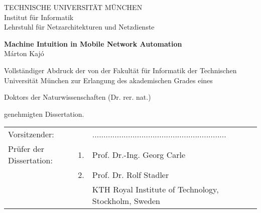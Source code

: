 

\begin{titlepage}
\setlength{\parindent}{0cm}
\begin{center}
	\large
  TECHNISCHE UNIVERSIT\"AT M\"UNCHEN\\
  Institut f\"ur Informatik\\
  Lehrstuhl f\"ur Netzarchitekturen und Netzdienste\\
\end{center}

\vfill

\begin{center}
	\Large
  \textbf{
  Machine Intuition in Mobile Network Automation}\\[1cm]
 	\large
  Márton Kajó
\end{center}

\vfill

Vollst\"andiger Abdruck der von der Fakult\"at f\"ur Informatik %
der Technischen Universit\"at M\"unchen zur Erlangung des akademischen Grades eines
\begin{center}
Doktors der Naturwissenschaften (Dr. rer. nat.)
\end{center}
genehmigten Dissertation.

\vspace{0.5cm}

\begin{center}
\setlength{\tabcolsep}{0pt}
\begin{tabular}{p{4.7cm}p{0.7cm}l}
Vorsitzender:               &    & ............................................................\\
Pr\"ufer der Dissertation:  & 1. & Prof. Dr.-Ing. Georg Carle\\
                            & 2. & Prof. Dr. Rolf Stadler\\
                            &    & KTH Royal Institute of Technology, Stockholm, Sweden

\end{tabular}
\end{center}

\vspace{1.5cm}


\end{titlepage}  
